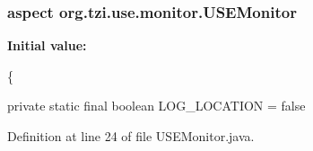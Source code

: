 \hypertarget{namespaceorg_1_1tzi_1_1use_1_1monitor_a475b77c2dbeb7873d108e4e3cccc16be}{
\subsubsection[{U\-S\-E\-Monitor}]{\setlength{\rightskip}{0pt plus 5cm}aspect org.\-tzi.\-use.\-monitor.\-U\-S\-E\-Monitor}}\label{namespaceorg_1_1tzi_1_1use_1_1monitor_a475b77c2dbeb7873d108e4e3cccc16be}
{\bfseries Initial value\-:}
\begin{DoxyCode}
\{
    
    \textcolor{keyword}{private} \textcolor{keyword}{static} \textcolor{keyword}{final} \textcolor{keywordtype}{boolean} LOG\_LOCATION = \textcolor{keyword}{false}
\end{DoxyCode}


Definition at line 24 of file U\-S\-E\-Monitor.\-java.

